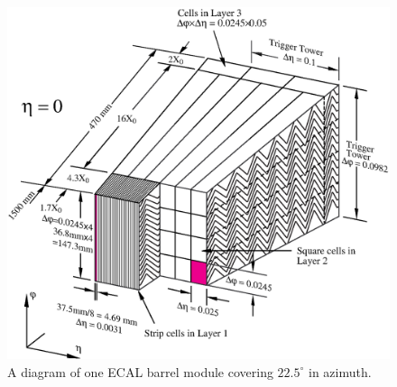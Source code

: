 \begin{figure}[ht]
\centering
\includegraphics[width=.8\textwidth]{figures/atlas/emcal_barrel_module.eps}
\caption{ A diagram of one ECAL barrel module 
covering $22.5^{\circ}$ in azimuth.}
\label{fig:atlas_emcal_module}
\end{figure}

